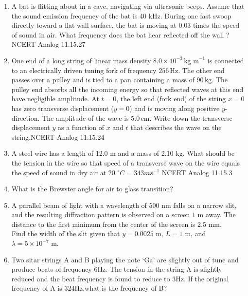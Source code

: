 \begin{enumerate}[label=\thesection.\arabic*,ref=\thesection.\theenumi]
\item A bat is flitting about in a cave, navigating via ultrasonic beeps. Assume that the
sound emission frequency of the bat is 40 kHz. During one fast swoop directly
toward a flat wall surface, the bat is moving at 0.03 times the speed of sound in air.
What frequency does the bat hear reflected off the wall ? \hfill{NCERT Analog 11.15.27}\\
\solution
\pagebreak
\item One end of a long string of linear mass density $8.0 \times 10^{-3} \, \text{kg m}^{-1}$ is connected to an electrically driven tuning fork of frequency $256 \, \text{Hz}$. The other end passes over a pulley and is tied to a pan containing a mass of $90 \, \text{kg}$. The pulley end absorbs all the incoming energy so that reflected waves at this end have negligible amplitude. At $t=0$, the left end (fork end) of the string $x=0$ has zero transverse displacement ($y=0$) and is moving along positive $y$-direction. The amplitude of the wave is $5.0 \, \text{cm}$. Write down the transverse displacement $y$ as a function of $x$ and $t$ that describes the wave on the string.\hfill{NCERT Analog 11.15.24} \\
\solution
\pagebreak
\item A steel wire has a length of 12.0 m and a mass of 2.10 kg. What should be the
tension in the wire so that speed of a transverse wave on the wire equals the speed
of sound in dry air at 20 $^{\circ} C = 343ms^{-1}$ \hfill{NCERT Analog 11.15.3}\\
\solution
\pagebreak
\item What is the Brewster angle for air to glass transition?\\
\solution
\pagebreak
\item A parallel beam of light with a wavelength of $500$ nm falls on a narrow slit, and the resulting diffraction pattern is observed on a screen $1$ m away. The distance to the first minimum from the center of the screen is $2.5$ mm.\\
Find the width of the slit given that $y = 0.0025$ m, $L = 1$ m, and $\lambda = 5 \times 10^{-7}$ m.\\
\solution
\pagebreak

\item Two sitar strings A and B playing the note `Ga' are slightly out of tune and produce beats of frequency $6$Hz. The tension in the string A is slightly reduced and the beat frequency is found to reduce to $3$Hz. If the original frequency of A is $324$Hz,what is the frequency of B?\\
\solution
\pagebreak


\end{enumerate}
